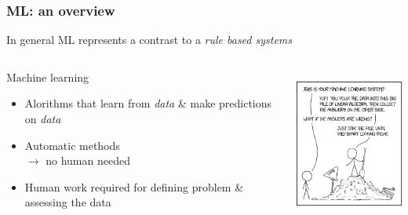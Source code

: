 \documentclass{beamer}
\begin{document}
\begin{frame}
    \frametitle{ML: an overview}
    \vspace*{-7mm}
    In general ML represents a contrast to a \emph{rule based systems}
    \begin{columns}[T] %
        \begin{column}{.48\textwidth}
            \vspace*{-3mm}
            \begin{block}{Machine learning}
                \begin{itemize}
                    \item<1-> Alorithms that learn from \emph{data} \& make predictions on \emph{data}
                    \item<2-> Automatic methods\\$\to$ no human needed
                    \item<3-> Human work required for defining problem \& assessing the data
                \end{itemize}
            \end{block}
        \end{column}%
        \hfill%
        \begin{column}{.48\textwidth}
            \includegraphics[height=5cm,keepaspectratio]{pics/machine_learning.png}%
            
        \end{column}%
    \end{columns}
\end{frame}

\end{document}
